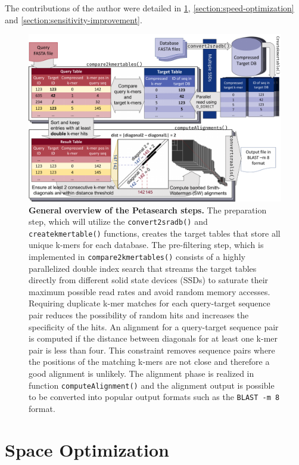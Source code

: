 The contributions of the author were detailed in \cref{section:space-optimization}, \cref{section:speed-optimization} and \cref{section:sensitivity-improvement}.

\begin{figpage}
  \begin{figure}
    \includegraphics[width=\textwidth]{images/overview.pdf}
    \caption{
      \textbf{General overview of the Petasearch steps.} The preparation step, which will utilize the \texttt{convert2sradb()} and \texttt{createkmertable()} functions, creates the target tables that store all unique k-mers for each database. The pre-filtering step, which is implemented in \texttt{compare2kmertables()} consists of a highly parallelized double index search that streams the target tables directly from different solid state devices (SSDs) to saturate their maximum possible read rates and avoid random memory accesses. Requiring duplicate k-mer matches for each query-target sequence pair reduces the possibility of random hits and increases the specificity of the hits. An alignment for a query-target sequence pair is computed if the distance between diagonals for at least one k-mer pair is less than four. This constraint removes sequence pairs where the positions of the matching k-mers are not close and therefore a good alignment is unlikely. The alignment phase is realized in function \texttt{computeAlignment()} and the alignment output is possible to be converted into popular output formats such as the \texttt{BLAST -m 8} format.
    }
    \label{fig:overview}
  \end{figure}
\end{figpage}

\section{Space Optimization} \label{section:space-optimization}

